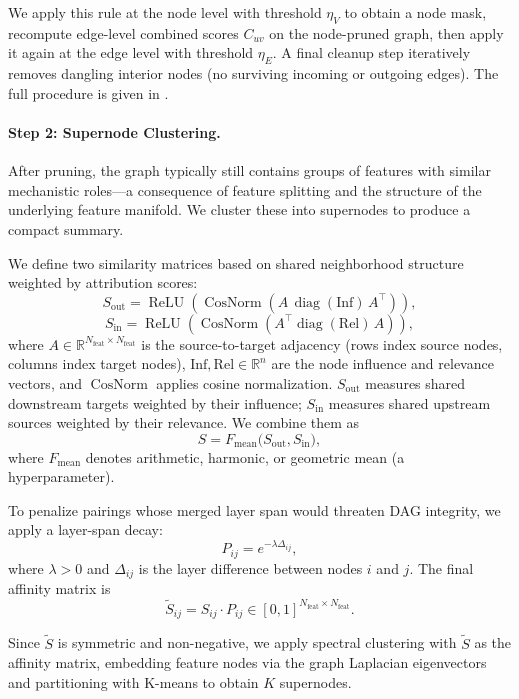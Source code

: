 \documentclass[11pt]{article}
\newcommand{\R}{\mathbb{R}}
\begin{document}
We apply this rule at the node level with threshold $\eta_V$ to obtain a node mask, recompute edge-level combined scores $C_{uv}$ on the node-pruned graph, then apply it again at the edge level with threshold $\eta_E$. A final cleanup step iteratively removes dangling interior nodes (no surviving incoming or outgoing edges). The full procedure is given in .

\paragraph{Step 2: Supernode Clustering.}
After pruning, the graph typically still contains groups of features with similar mechanistic roles—a consequence of feature splitting \cite{split} and the structure of the underlying feature manifold. We cluster these into supernodes to produce a compact summary.

We define two similarity matrices based on shared neighborhood structure weighted by attribution scores:
\[
S_{\mathrm{out}} = \operatorname{ReLU}\!\left(\operatorname{CosNorm}(A\,\operatorname{diag}(\mathrm{Inf})\,A^{\top})\right),
\]
\[
S_{\mathrm{in}} = \operatorname{ReLU}\!\left(\operatorname{CosNorm}(A^{\top}\operatorname{diag}(\mathrm{Rel})\,A)\right),
\]
where $A \in \R^{N_\mathrm{feat} \times N_\mathrm{feat}}$ is the source-to-target adjacency (rows index source nodes, columns index target nodes), $\mathrm{Inf}, \mathrm{Rel} \in \R^n$ are the node influence and relevance vectors, and $\operatorname{CosNorm}$ applies cosine normalization. $S_\mathrm{out}$ measures shared downstream targets weighted by their influence; $S_\mathrm{in}$ measures shared upstream sources weighted by their relevance. We combine them as
\[
S = F_{\mathrm{mean}}\bigl(S_{\mathrm{out}}, S_{\mathrm{in}}\bigr),
\]
where $F_{\mathrm{mean}}$ denotes arithmetic, harmonic, or geometric mean (a hyperparameter).

To penalize pairings whose merged layer span would threaten DAG integrity, we apply a layer-span decay:
\[
P_{ij} = e^{-\lambda \Delta_{ij}},
\]
where $\lambda > 0$ and $\Delta_{ij}$ is the layer difference between nodes $i$ and $j$. The final affinity matrix is
\[
\tilde{S}_{ij} = S_{ij} \cdot P_{ij} \in [0,1]^{N_{\mathrm{feat}} \times N_{\mathrm{feat}}}.
\]

Since $\tilde{S}$ is symmetric and non-negative, we apply spectral clustering with $\tilde{S}$ as the affinity matrix, embedding feature nodes via the graph Laplacian eigenvectors and partitioning with K-means to obtain $K$ supernodes.
\end{document}
